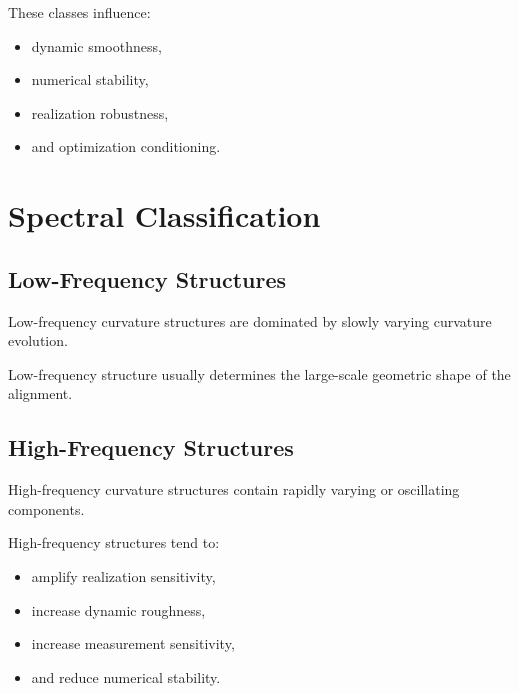 These classes influence:
\begin{itemize}
\item dynamic smoothness,
\item numerical stability,
\item realization robustness,
\item and optimization conditioning.
\end{itemize}

\section{Spectral Classification}

\subsection{Low-Frequency Structures}

\begin{definition}
\label{def:low-frequency-curvature-class}
Low-frequency curvature structures are dominated by slowly varying
curvature evolution.
\end{definition}

Low-frequency structure usually determines the large-scale geometric
shape of the alignment.


\subsection{High-Frequency Structures}

\begin{definition}
\label{def:high-frequency-curvature-class}
High-frequency curvature structures contain rapidly varying or
oscillating components.
\end{definition}

High-frequency structures tend to:
\begin{itemize}
\item amplify realization sensitivity,
\item increase dynamic roughness,
\item increase measurement sensitivity,
\item and reduce numerical stability.
\end{itemize}

